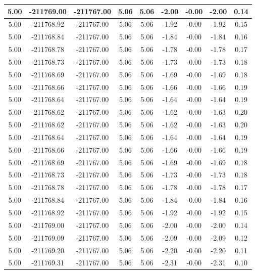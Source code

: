 \begin{table}[htbp]
\begin{adjustbox}{angle=90}
\begin{tabular}{|c|c|c|c|c|c|c|c|c|}
 5.00 & -211769.00 & -211767.00 & 5.06 & 5.06 & -2.00 & -0.00 & -2.00 & 0.14\\ \hline
 5.00 & -211768.92 & -211767.00 & 5.06 & 5.06 & -1.92 & -0.00 & -1.92 & 0.15\\ \hline
 5.00 & -211768.84 & -211767.00 & 5.06 & 5.06 & -1.84 & -0.00 & -1.84 & 0.16\\ \hline
 5.00 & -211768.78 & -211767.00 & 5.06 & 5.06 & -1.78 & -0.00 & -1.78 & 0.17\\ \hline
 5.00 & -211768.73 & -211767.00 & 5.06 & 5.06 & -1.73 & -0.00 & -1.73 & 0.18\\ \hline
 5.00 & -211768.69 & -211767.00 & 5.06 & 5.06 & -1.69 & -0.00 & -1.69 & 0.18\\ \hline
 5.00 & -211768.66 & -211767.00 & 5.06 & 5.06 & -1.66 & -0.00 & -1.66 & 0.19\\ \hline
 5.00 & -211768.64 & -211767.00 & 5.06 & 5.06 & -1.64 & -0.00 & -1.64 & 0.19\\ \hline
 5.00 & -211768.62 & -211767.00 & 5.06 & 5.06 & -1.62 & -0.00 & -1.63 & 0.20\\ \hline
 5.00 & -211768.62 & -211767.00 & 5.06 & 5.06 & -1.62 & -0.00 & -1.63 & 0.20\\ \hline
 5.00 & -211768.64 & -211767.00 & 5.06 & 5.06 & -1.64 & -0.00 & -1.64 & 0.19\\ \hline
 5.00 & -211768.66 & -211767.00 & 5.06 & 5.06 & -1.66 & -0.00 & -1.66 & 0.19\\ \hline
 5.00 & -211768.69 & -211767.00 & 5.06 & 5.06 & -1.69 & -0.00 & -1.69 & 0.18\\ \hline
 5.00 & -211768.73 & -211767.00 & 5.06 & 5.06 & -1.73 & -0.00 & -1.73 & 0.18\\ \hline
 5.00 & -211768.78 & -211767.00 & 5.06 & 5.06 & -1.78 & -0.00 & -1.78 & 0.17\\ \hline
 5.00 & -211768.84 & -211767.00 & 5.06 & 5.06 & -1.84 & -0.00 & -1.84 & 0.16\\ \hline
 5.00 & -211768.92 & -211767.00 & 5.06 & 5.06 & -1.92 & -0.00 & -1.92 & 0.15\\ \hline
 5.00 & -211769.00 & -211767.00 & 5.06 & 5.06 & -2.00 & -0.00 & -2.00 & 0.14\\ \hline
 5.00 & -211769.09 & -211767.00 & 5.06 & 5.06 & -2.09 & -0.00 & -2.09 & 0.12\\ \hline
 5.00 & -211769.20 & -211767.00 & 5.06 & 5.06 & -2.20 & -0.00 & -2.20 & 0.11\\ \hline
 5.00 & -211769.31 & -211767.00 & 5.06 & 5.06 & -2.31 & -0.00 & -2.31 & 0.10\\ \hline

\end{tabular}
\end{adjustbox}
\end{table}

